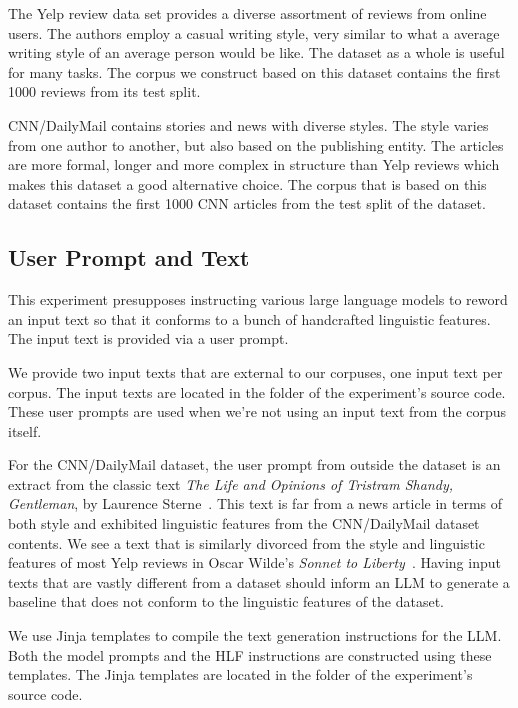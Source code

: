 \documentclass[11pt]{article}
\begin{document}
The Yelp review data set provides a diverse assortment of reviews from online
users.
The authors employ a casual writing style, very similar to what a average
writing style of an average person would be like.
The dataset as a whole is useful for many tasks.
The corpus we construct based on this dataset contains the first 1000 reviews
from its test split.

CNN/DailyMail contains stories and news with diverse styles.
The style varies from one author to another, but also based on the publishing
entity.
The articles are more formal, longer and more complex in structure than Yelp
reviews which makes this dataset a good alternative choice.
The corpus that is based on this dataset contains the first 1000 CNN articles
from the test split of the dataset.

\subsection{User Prompt and Text}\label{input-text}

This experiment presupposes instructing various large language models to reword
an input text so that it conforms to a bunch of handcrafted linguistic features.
The input text is provided via a user prompt.

We provide two input texts that are external to our corpuses, one input text per
corpus.
The input texts are located in the
\texttt{}
folder of the experiment's source code.
These user prompts are used when we're not using an input text from the
corpus itself.

For the CNN/DailyMail dataset, the user prompt from outside the dataset is an
extract from the classic text \textit{The Life and Opinions of Tristram Shandy,
    Gentleman}, by Laurence Sterne~\cite{sterne2003life}.
This text is far from a news article in terms of both style and exhibited
linguistic features from the CNN/DailyMail dataset contents.
We see a text that is similarly divorced from the style and linguistic
features of most Yelp reviews in Oscar Wilde's \textit{Sonnet to
    Liberty}~\cite{wilde1909poems}.
Having input texts that are vastly different from a dataset should inform an LLM
to generate a baseline that does not conform to the linguistic features of the
dataset.

We use Jinja templates to compile the text generation instructions for the LLM.
Both the model prompts and the HLF instructions are constructed using these
templates.
The Jinja templates are located in the
\texttt{}
folder of the experiment's source code.
\end{document}
